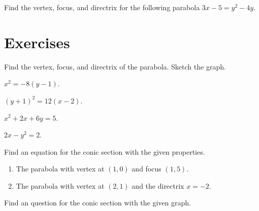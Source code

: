 \begin{example}
  Find the vertex, focus, and directrix for the following parabola $3x-5=y^2-4y$.
\end{example}

\newpage

\section*{Exercises}

\begin{exercise}
  Find the vertex, focus, and directrix of the parabola. Sketch the graph.\\
  \begin{enumerate*}
      \item $x^2=-8(y-1)$.
      \item $(y+1)^2=12(x-2)$.
      \item $x^2+2x+6y=5$.
      \item $2x-y^2=2$.
  \end{enumerate*}
\end{exercise}

\begin{exercise}
  Find an equation for the conic section with the given properties.
  \begin{enumerate}
      \item The parabola with vertex at $(1,0)$ and focus $(1, 5)$.
      \item The parabola with vertex at $(2,1)$ and the directrix $x=-2$.
  \end{enumerate}
  \end{exercise}

  \newpage

\begin{exercise}
    Find an question for the conic section with the given graph.\\
\end{exercise}

